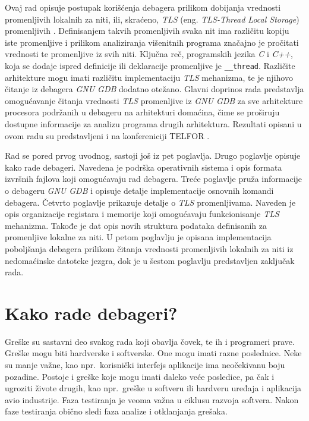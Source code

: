 \documentclass[12pt,oneside]{memoir}
\begin{document}
Ovaj rad opisuje postupak korišćenja debagera prilikom dobijanja vrednosti promenljivih lokalnih za niti, ili, skraćeno, \emph{TLS} (eng. \emph{TLS-Thread Local Storage}) promenljivih \cite{TLS}. Definisanjem takvih promenljivih svaka nit ima različitu kopiju iste promenljive i prilikom analiziranja višenitnih programa značajno je pročitati vrednosti te promenljive iz svih niti. Ključna reč, programskih jezika \emph{C} i \emph{C++}, koja se dodaje ispred definicije ili deklaracije promenljive je \texttt{\_\_thread}. Različite arhitekture mogu imati različitu implementaciju \emph{TLS} mehanizma, te je njihovo čitanje iz debagera \emph{GNU GDB} dodatno otežano.
Glavni doprinos rada predstavlja omogućavanje čitanja vrednosti \emph{TLS} promenljive iz \emph{GNU GDB} za sve arhitekture procesora podržanih u debageru na arhitekturi domaćina, čime se proširuju dostupne informacije za analizu programa drugih arhitektura. Rezultati opisani u ovom radu su predstavljeni i na konfereniciji TELFOR \cite{TELFOR}.

Rad se pored prvog uvodnog, sastoji još iz pet poglavlja. Drugo poglavlje opisuje kako rade debageri. Navedena je podrška operativnih sistema i opis formata izvršnih fajlova koji omogućavaju rad debagera. Treće poglavlje pruža informacije o debageru \emph{GNU GDB} i opisuje detalje implementacije osnovnih komandi debagera. Četvrto poglavlje prikazuje detalje o \emph{TLS} promenljivama. Naveden je opis organizacije registara i memorije koji omogućavaju funkcionisanje \emph{TLS} mehanizma. Takođe je dat opis novih struktura podataka definisanih za promenljive lokalne za niti. U petom poglavlju je opisana implementacija poboljšanja debagera prilikom čitanja vrednosti promenljivih lokalnih za niti iz nedomaćinske datoteke jezgra, dok je u šestom poglavlju predstavljen zaključak rada.



\chapter{Kako rade debageri?}
\label{chp:debageri}

Greške su sastavni deo svakog rada koji obavlja čovek, te ih i programeri prave. Greške mogu biti hardverske i softverske. One mogu imati razne poslednice. Neke su manje važne, kao npr.~korisnički interfejs aplikacije ima neočekivanu boju pozadine. Postoje i greške koje mogu imati daleko veće posledice, pa čak i ugroziti živote drugih, kao npr.~greške u softveru ili hardveru uređaja i aplikacija avio industrije. Faza testiranja je veoma važna u ciklusu razvoja softvera. Nakon faze testiranja obično sledi faza analize i otklanjanja grešaka.
\end{document}
